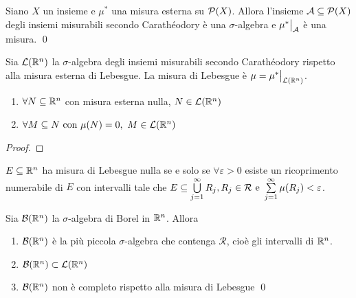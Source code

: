 \begin{theorem}
	Siano $X$ un insieme e $\mu^*$ una misura esterna su $\mathcal{P}(X)$. Allora l'insieme $\mathcal{A} \subseteq \mathcal{P}(X)$ degli insiemi misurabili secondo Carathéodory è una $\sigma$-algebra e $\restr{\mu^*}{\A}$ è una misura.
	\qed
\end{theorem}

\begin{definition}
	Sia $\mathcal{L}(\mathbb{R}^n)$ la $\sigma$-algebra degli insiemi misurabili secondo Carathéodory rispetto alla misura esterna di Lebesgue. La misura di Lebesgue è $\mu=\restr{\mu^*}{\mathcal{L}(\R^n)}$.
\end{definition}

\begin{theorem}
	\leavevmode
	\begin{enumerate}
		\item $\forall N \subseteq \mathbb{R}^n$ con misura esterna nulla, $N \in \mathcal{L}(\mathbb{R}^n)$
		\item $\forall M \subseteq N \text{ con } \mu(N)=0, \ M \in \mathcal{L}(\mathbb{R}^n)$
	\end{enumerate}
\end{theorem}

\begin{proof}
\end{proof}

\begin{definition}
	$E \subseteq \mathbb{R}^n$ ha misura di Lebesgue nulla se e solo se $\forall \varepsilon > 0$ esiste un ricoprimento numerabile di $E$ con intervalli tale che $E \subseteq \bigcup\limits_{j=1}^\infty R_j, R_j \in \mathcal{R} \text{ e } \sum\limits_{j=1}^\infty \mu(R_j)<\varepsilon$.
\end{definition}

\begin{theorem}
	Sia $\mathcal{B}(\mathbb{R}^n)$ la $\sigma$-algebra di Borel in $\mathbb{R}^n$. Allora
	\begin{enumerate}
		\item $\mathcal{B}(\mathbb{R}^n)$ è la più piccola $\sigma$-algebra che contenga $\mathcal{R}$, cioè gli intervalli di $\mathbb{R}^n$.
		\item $\mathcal{B}(\mathbb{R}^n)\subset \mathcal{L}(\mathbb{R}^n)$
		\item $\mathcal{B}(\mathbb{R}^n)$ non è completo rispetto alla misura di Lebesgue
		\qed
	\end{enumerate}
\end{theorem}

